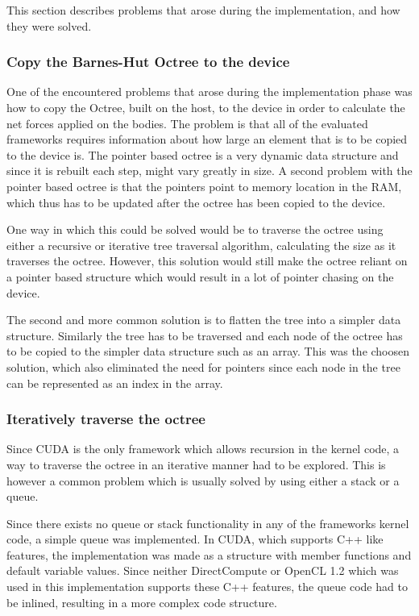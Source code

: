This section describes problems that arose during the implementation, and how they were solved.

\subsubsection{Copy the Barnes-Hut Octree to the device}
One of the encountered problems that arose during the implementation phase was how to copy the Octree, built on the host, to the device in order to calculate the net forces applied on the bodies. The problem is that all of the evaluated frameworks requires information about how large an element that is to be copied to the device is. The pointer based octree is a very dynamic data structure and since it is rebuilt each step, might vary greatly in size. A second problem with the pointer based octree is that the pointers point to memory location in the RAM, which thus has to be updated after the octree has been copied to the device.

One way in which this could be solved would be to traverse the octree using either a recursive or iterative tree traversal algorithm, calculating the size as it traverses the octree. However, this solution would still make the octree reliant on a pointer based structure which would result in a lot of pointer chasing on the device.

The second and more common solution is to flatten the tree into a simpler data structure. Similarly the tree has to be traversed and each node of the octree has to be copied to the simpler data structure such as an array. 
This was the choosen solution, which also eliminated the need for pointers since each node in the tree can be represented as an index in the array.

\subsubsection{Iteratively traverse the octree}
Since CUDA is the only framework which allows recursion in the kernel code, a way to traverse the octree in an iterative manner had to be explored. This is however a common problem which is usually solved by using either a stack or a queue. 

Since there exists no queue or stack functionality in any of the frameworks kernel code, a simple queue was implemented. In CUDA, which supports C++ like features, the implementation was made as a structure with member functions and default variable values. Since neither DirectCompute or OpenCL 1.2 which was used in this implementation supports these C++ features, the queue code had to be inlined, resulting in a more complex code structure.

